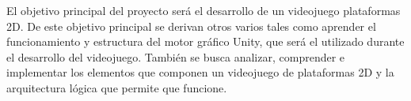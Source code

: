 
El objetivo principal del proyecto será el desarrollo de un videojuego plataformas 2D. De este objetivo principal se derivan otros varios tales como aprender el funcionamiento y estructura del motor gráfico Unity, que será el utilizado durante el desarrollo del videojuego. También se busca analizar, comprender e implementar los elementos que componen un videojuego de plataformas 2D y la arquitectura lógica que permite que funcione.
